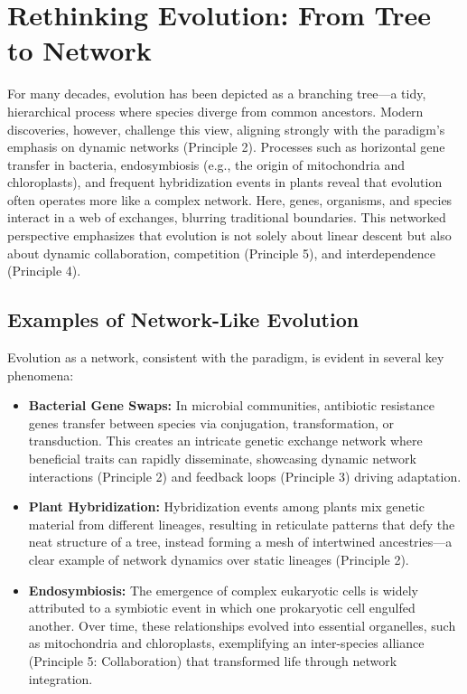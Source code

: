 \documentclass[12pt,openany]{book}
\begin{document}
\section{Rethinking Evolution: From Tree to Network}
For many decades, evolution has been depicted as a branching tree—a tidy, hierarchical process where species diverge from common ancestors. Modern discoveries, however, challenge this view, aligning strongly with the paradigm's emphasis on dynamic networks (Principle 2). Processes such as horizontal gene transfer in bacteria, endosymbiosis (e.g., the origin of mitochondria and chloroplasts), and frequent hybridization events in plants reveal that evolution often operates more like a complex network. Here, genes, organisms, and species interact in a web of exchanges, blurring traditional boundaries. This networked perspective emphasizes that evolution is not solely about linear descent but also about dynamic collaboration, competition (Principle 5), and interdependence (Principle 4). %

\subsection{Examples of Network-Like Evolution}
Evolution as a network, consistent with the paradigm, is evident in several key phenomena:
\begin{itemize}
    \item \textbf{Bacterial Gene Swaps:} In microbial communities, antibiotic resistance genes transfer between species via conjugation, transformation, or transduction. This creates an intricate genetic exchange network where beneficial traits can rapidly disseminate, showcasing dynamic network interactions (Principle 2) and feedback loops (Principle 3) driving adaptation.
    \item \textbf{Plant Hybridization:} Hybridization events among plants mix genetic material from different lineages, resulting in reticulate patterns that defy the neat structure of a tree, instead forming a mesh of intertwined ancestries—a clear example of network dynamics over static lineages (Principle 2).
    \item \textbf{Endosymbiosis:} The emergence of complex eukaryotic cells is widely attributed to a symbiotic event in which one prokaryotic cell engulfed another. Over time, these relationships evolved into essential organelles, such as mitochondria and chloroplasts, exemplifying an inter-species alliance (Principle 5: Collaboration) that transformed life through network integration.
\end{itemize} %
\end{document}
